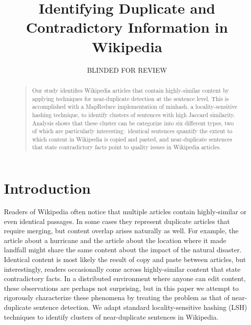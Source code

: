 \documentclass[letterpaper]{article}
\begin{document}
%
\title{Identifying Duplicate and Contradictory Information in Wikipedia}
\author{
BLINDED FOR REVIEW
}
\maketitle
\begin{abstract}
\begin{quote}
Our study identifies Wikipedia articles that contain
highly-similar content by applying techniques for near-duplicate
detection at the sentence level. This is accomplished with a MapReduce
implementation of minhash, a locality-sensitive hashing technique, to
identify clusters of sentences with high Jaccard similarity. Analysis
shows that these cluster can be categorize into six different types, two
of which are particularly interesting:\ identical sentences
quantify the extent to which content in Wikipedia is copied and
pasted, and near-duplicate sentences that state contradictory facts
point to quality issues in Wikipedia articles.
\end{quote}
\end{abstract}

\section{Introduction}

Readers of Wikipedia often notice that multiple articles contain
highly-similar or even identical passages. In some cases they represent
duplicate articles that require merging, but content overlap arises
naturally as well. For example, the article about a hurricane and the
article about the location where it made landfall might share the same
content about the impact of the natural disaster. Identical content is
most likely the result of copy and paste between articles, but
interestingly, readers occasionally come across highly-similar content that
state contradictory facts. In a distributed environment where anyone can
edit content, these observations are perhaps not surprising, 
but in this paper we attempt to
rigorously characterize these phenomena by treating the
problem as that of near-duplicate sentence detection. We
adapt standard locality-sensitive hashing (LSH) techniques to identify
clusters of near-duplicate sentences in Wikipedia.
\end{document}
